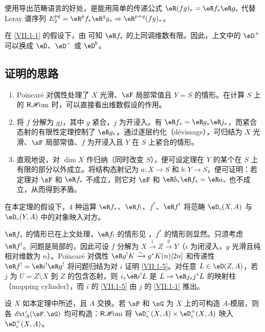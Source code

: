 使用导出范畴语言的好处，是能用简单的传递公式 $\eR(f g)_\ast = \eR f_\ast \eR g_\ast$ 代替 Leray 谱序列 $E_2^{p q} = \eR^p f_\ast \eR^q g_\ast \Rightarrow \eR^{p+q} (f g)_\ast$。

在 \ref{VII:1-1} 的假设下，由 \cite[X]{sga4} 可知 $\eR f_\ast$ 的上同调维数有限。因此，上文中的 $\eD^+$ 可以换成 $\eD$、$\eD^-$ 或 $\eD^b$。

\subsection{证明的思路}\label{VII:1-4}
\begin{enumerate}[\indent a)]
  \item Poincaré 对偶性处理了 $X$ 光滑、$\sF$ 局部常值且 $Y=S$ 的情形。在计算 $S$ 上的 $\operatorname{\mathsf{R}\mathscr{H}\!om}$ 时，可以直接看出维数假设的作用。
  \item 将 $f$ 分解为 $g j$，其中 $g$ 紧合，$j$ 为开浸入。有 $\eR f_\ast = \eR g_\ast \eR j_\ast$，而紧合态射的有限性定理控制了 $\eR g_\ast$。通过逐层约化（dévissage），可归结为 $X$ 光滑、$\sF$ 局部常值、$f$ 为开浸入且 $Y$ 在 $S$ 上紧合的情形。
  \item 直观地说，对 $\dim X$ 作归纳（同时改变 $S$），便可设定理在 $Y$ 的某个在 $S$ 上有限的部分以外成立。将结构态射记为 $a:X\to S$ 和 $b:Y\to S$，便可证明：若定理对 $\sF$ 和 $\eR f_\ast$ 不成立，则它对 $\sF$ 和 $\eR b_\ast \eR f_\ast = \eR a_\ast$ 也不成立，从而得到矛盾。
\end{enumerate}

\begin{corollary_}\label{VII:1-5}
在本定理的假设下，$4$ 种运算 $\eR f_\ast$、$\eR f_!$、$f^\ast$、$\eR f^!$ 将范畴 $\eD_c(X,A)$ 与 $\eD_c(Y,A)$ 中的对象映入对方。
\end{corollary_}

$\eR f_\ast$ 的情形已在上文处理，$\eR f_!$ 的情形见 \cite[XVII 5.3]{sga4}，$f^\ast$ 的情形则显然。只须考虑 $\eR f^!$。问题是局部的，因此可设 $f$ 分解为 $X\xrightarrow i Z \xrightarrow g Y$（$i$ 为闭浸入，$g$ 光滑且纯相对维数为 $n$）。Poincaré 对偶性 $\eR g^! K \iso g^\ast K(n)[2 n]$ 和传递性 $\eR f^! = \eR i^! \eR g^!$ 将问题归结为对 $i$ 证明 \ref{VII:1-5}。对任意 $L\in \eD(Z,A)$，若 $j$ 为 $U=Z\setminus X$ 到 $Z$ 的包含态射，则 $i_\ast \eR i^! L$ 是 $L\to \eR j_\ast j^\ast L$ 的映射柱（mapping cylinder），而 $i$ 的 \ref{VII:1-5} 由 $j$ 的 \ref{VII:1-1} 推出。

\begin{corollary_}\label{VII:1-6}
设 $X$ 如本定理中所述，且 $A$ 交换。若 $\sF$ 和 $\sG$ 为 $X$ 上的可构造 $A$-模层，则各 $\Ext_A^i(\sF,\sG)$ 均可构造：$\operatorname{\mathsf{R}\mathscr{H}\!om}$ 将 $\eD_c^-(X,A)\times \eD_c^+(X,A)$ 映入 $\eD_c^+(X,A)$。
\end{corollary_}

